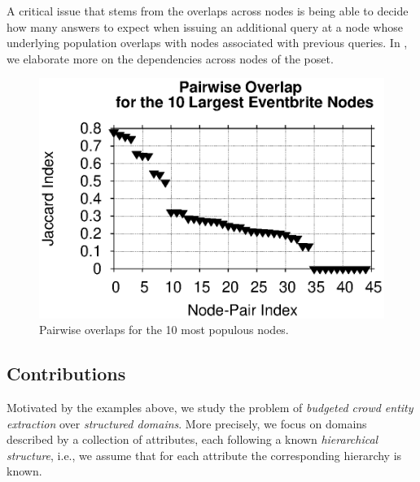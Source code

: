 A critical issue that stems from the overlaps across nodes is being able to decide how many answers to expect when issuing an additional query at a node whose underlying population overlaps with nodes associated with previous queries. In , we elaborate more on the dependencies across nodes of the poset.

\begin{figure}
	\begin{center}
	\includegraphics[clip,scale=0.5]{figs/overlaps.eps}
	\caption{Pairwise overlaps for the 10 most populous nodes.}
	\label{fig:eventbriteover}
	\vspace{-20pt}
	\end{center}
\end{figure}

\subsection{Contributions}
\label{sec:contributions}
Motivated by the examples above, we study the problem of {\em budgeted crowd entity extraction} over {\em structured domains}. More precisely, we focus on domains described by a collection of attributes, each following a known {\em hierarchical structure}, i.e., we assume that for each attribute the corresponding hierarchy is known.

